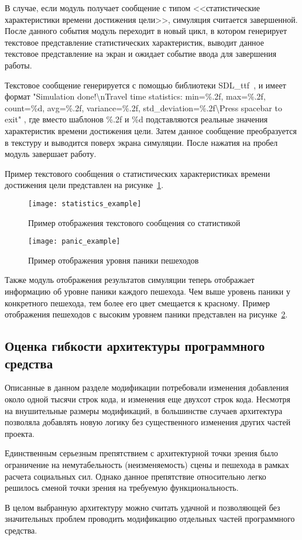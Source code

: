 В случае, если модуль получает сообщение с типом <<статистические характеристики времени достижения цели>>, симуляция считается завершенной.
После данного события модуль переходит в новый цикл, в котором генерирует текстовое представление статистических характеристик,
выводит данное текстовое представление на экран и ожидает событие ввода для завершения работы.

Текстовое сообщение генерируется с помощью библиотеки SDL\_ttf~\cite{libsdl_ttf_home}, и имеет формат
"Simulation done!\textbackslash{}nTravel time statistics: min=\%.2f, max=\%.2f, count=\%d, avg=\%.2f, variance=\%.2f, std\_deviation=\%.2f\textbackslash{}Press spacebar to exit" ,
где вместо шаблонов \%.2f и \%d подставляются реальные значения характеристик времени достижения цели.
Затем данное сообщение преобразуется в текстуру и выводится поверх экрана симуляции.  После нажатия на пробел модуль завершает работу.

Пример текстового сообщения о статистических характеристиках времени достижения цели представлен на рисунке~\ref{sec:development:animator:statistics_example}.

\begin{figure}[!ht]
  \centering
  \texttt{[image: statistics\_example]}
  \caption{Пример отображения текстового сообщения со статистикой}
  \label{sec:development:animator:statistics_example}
\end{figure}

\begin{figure}[!ht]
  \centering
  \texttt{[image: panic\_example]}
  \caption{Пример отображения уровня паники пешеходов}
  \label{sec:development:animator:panic_example}
\end{figure}

Также модуль отображения результатов симуляции теперь отображает информацию об уровне паники каждого пешехода.
Чем выше уровень паники у конкретного пешехода, тем более его цвет смещается к красному.
Пример отображения пешеходов с высоким уровнем паники представлен на рисунке~\ref{sec:development:animator:panic_example}.

\subsection{Оценка гибкости архитектуры программного средства}
\label{sec:development:arch}

Описанные в данном разделе модификации потребовали изменения добавления около одной тысячи строк кода, и изменения еще двухсот строк кода.
Несмотря на внушительные размеры модификаций, в большинстве случаев архитектура позволяла добавлять новую логику без существенного изменения
других частей проекта.

Единственным серьезным препятствием с архитектурной точки зрения было ограничение на немутабельность (неизменяемость) сцены и пешехода в рамках расчета
социальных сил. Однако данное препятствие относительно легко решилось сменой точки зрения на требуемую функциональность.

В целом выбранную архитектуру можно считать удачной и
позволяющей без значительных проблем проводить модификацию отдельных частей программного средства.
